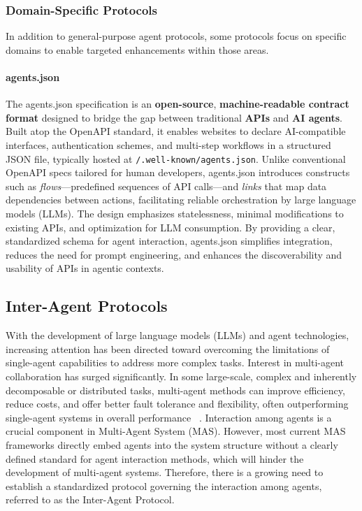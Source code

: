 \documentclass[10pt,preprint]{article}
\begin{document}
\subsubsection{Domain-Specific Protocols}
In addition to general-purpose agent protocols, some protocols focus on specific domains to enable targeted enhancements within those areas.

\paragraph{agents.json~\citep{agentsjson2025}} The agents.json  specification is an \textbf{open-source}, \textbf{machine-readable contract format} designed to bridge the gap between traditional \textbf{APIs} and \textbf{AI agents}. Built atop the OpenAPI standard, it enables websites to declare AI-compatible interfaces, authentication schemes, and multi-step workflows in a structured JSON file, typically hosted at \texttt{/.well-known/agents.json}. Unlike conventional OpenAPI specs tailored for human developers, agents.json introduces constructs such as \textit{flows}—predefined sequences of API calls—and \textit{links} that map data dependencies between actions, facilitating reliable orchestration by large language models (LLMs). The design emphasizes statelessness, minimal modifications to existing APIs, and optimization for LLM consumption. By providing a clear, standardized schema for agent interaction, agents.json simplifies integration, reduces the need for prompt engineering, and enhances the discoverability and usability of APIs in agentic contexts. 


\subsection{Inter-Agent Protocols}
With the development of large language models (LLMs) and agent technologies, increasing attention has been directed toward overcoming the limitations of single-agent capabilities to address more complex tasks.  Interest in multi-agent collaboration has surged significantly. In some large-scale, complex and inherently decomposable or distributed tasks, multi-agent methods can improve efficiency, reduce costs, and offer better fault tolerance and flexibility, often outperforming single-agent systems in overall performance ~\citep{stone2000multiagent, dorri2018multi}. Interaction among agents is a crucial component in Multi-Agent System (MAS). However, most current MAS frameworks directly embed agents into the system structure without a clearly defined standard for agent interaction methods, which will hinder the development of multi-agent systems. Therefore, there is a growing need to establish a standardized protocol governing the interaction among agents, referred to as the Inter-Agent Protocol.
\end{document}
